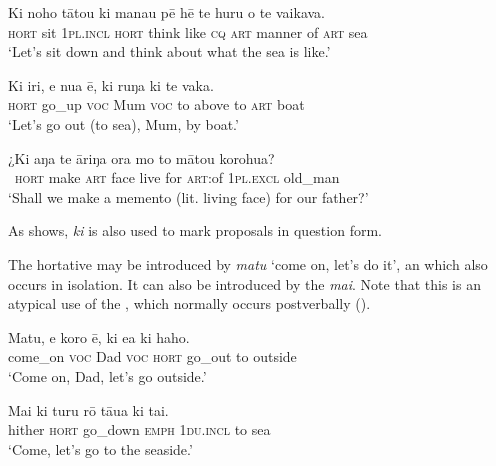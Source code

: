 \ea\label{ex:10.12}
\gll Ki noho tātou ki mana{\ꞌ}u pē hē te huru o te vaikava. \\
\textsc{hort} sit \textsc{1pl.incl} \textsc{hort} think like \textsc{cq} \textsc{art} manner of \textsc{art} sea \\

\glt 
‘Let’s sit down and think about what the sea is like.’ \textstyleExampleref{[R334.173]} 
\z

\ea\label{ex:10.13}
\gll Ki iri, e nua ē, ki ruŋa ki te vaka. \\
\textsc{hort} go\_up \textsc{voc} Mum \textsc{voc} to above to \textsc{art} boat \\

\glt 
‘Let’s go out (to sea), Mum, by boat.’ \textstyleExampleref{[R368.024]} 
\z

\ea\label{ex:10.14}
\gll ¿Ki aŋa te {\ꞌ}āriŋa ora mo to mātou korohu{\ꞌ}a? \\
~\textsc{hort} make \textsc{art} face live for \textsc{art}:of \textsc{1pl.excl} old\_man \\

\glt
‘Shall we make a memento (lit. living face) for our father?’ \textstyleExampleref{[Ley-4-06.004]}
\z

As  shows, \textit{ki} is also used to mark proposals in question form.

The hortative may be introduced by \textit{matu} ‘come on, let’s do it’, an  which also occurs in isolation. It can also be introduced by the  \textit{mai}. Note that this is an atypical use of the , which normally occurs postverbally ().

\ea\label{ex:10.15}
\gll Matu, e koro ē, ki e{\ꞌ}a ki haho. \\
come\_on \textsc{voc} Dad \textsc{voc} \textsc{hort} go\_out to outside \\

\glt 
‘Come on, Dad, let’s go outside.’ \textstyleExampleref{[R229.107]} 
\z

\ea\label{ex:10.16}
\gll Mai ki turu rō tāua ki tai. \\
hither \textsc{hort} go\_down \textsc{emph} \textsc{1du.incl} to sea \\

\glt 
‘Come, let’s go to the seaside.’ \textstyleExampleref{[R245.112]}\textstyleExampleref{} 
\z
{}

